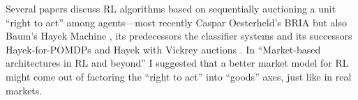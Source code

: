 %
%

Several
papers discuss RL algorithms based on sequentially auctioning a unit ``right to act'' among
agents---most recently Caspar Oesterheld's BRIA \citep{oesterheldTheoryBoundedInductive2023}
but also Baum's Hayek
Machine \citep{baumModelIntelligenceEconomy1999}, its predecessors the classifier systems
\citep{hollandPropertiesBucketBrigade1985a, schmidhuberEvolutionaryPrinciplesSelfreferential1987, schmidhuberLocalLearningAlgorithm1989} and
its successors Hayek-for-POMDPs \citep{kweeMarketBasedReinforcementLearning2001} and
Hayek with Vickrey auctions \citep{changDecentralizedReinforcementLearning2020}. In
``Market-based architectures in RL and beyond'' \citep{pallavisudhirMarketbasedArchitectures2025}
I suggested that a better market model for RL might come out of factoring the ``right to
act'' into ``goods'' axes, just like in real markets.
